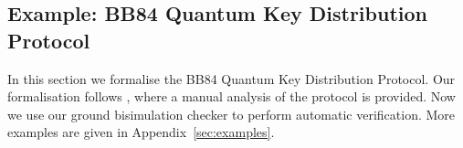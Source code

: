 \documentclass[a4paper,UKenglish,cleveref, autoref]{lipics-v2019}
\begin{document}
\subsection{Example: BB84 Quantum Key Distribution Protocol}
\label{sec:ss}
In this section we formalise the BB84 Quantum Key Distribution Protocol. Our formalisation follows \cite{DF12}, where a manual analysis of the protocol is provided. Now we use our ground bisimulation checker to perform automatic verification.
More examples are given in Appendix~\ref{sec:examples}.

\end{document}
